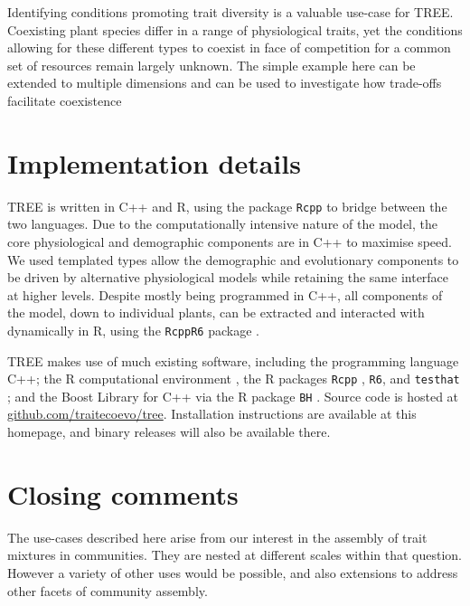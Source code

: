 \documentclass[]{article}
\begin{document}
Identifying conditions promoting trait diversity is a valuable use-case
for TREE. Coexisting plant species differ in a range of physiological
traits, yet the conditions allowing for these different types to coexist
in face of competition for a common set of resources remain largely
unknown. The simple example here can be extended to multiple dimensions
and can be used to investigate how trade-offs facilitate coexistence
\citep{Falster-2015}

\section{Implementation details}\label{implementation-details}

TREE is written in C++ and R, using the package \texttt{Rcpp}
\citep{Eddelbuettel-2011, Eddelbuettel-2013} to bridge between the two
languages. Due to the computationally intensive nature of the model, the
core physiological and demographic components are in C++ to maximise
speed. We used templated types allow the demographic and evolutionary
components to be driven by alternative physiological models while
retaining the same interface at higher levels. Despite mostly being
programmed in C++, all components of the model, down to individual
plants, can be extracted and interacted with dynamically in R, using the
\texttt{RcppR6} package \citep{RcppR6}.

TREE makes use of much existing software, including the programming
language C++; the R computational environment \citep{R-2015}, the R
packages \texttt{Rcpp} \citep{Eddelbuettel-2011, Eddelbuettel-2013},
\texttt{R6}\citep{Chang-2014}, and \texttt{testhat}
\citep{Wickham-2011}; and the Boost Library for C++
\citep{Schaling-2014} via the R package \texttt{BH}
\citep{Eddelbuettel-2015}. Source code is hosted at
\href{https://github.com/traitecoevo/tree}{github.com/traitecoevo/tree}.
Installation instructions are available at this homepage, and binary
releases will also be available there.

\section{Closing comments}\label{closing-comments}

The use-cases described here arise from our interest in the assembly of
trait mixtures in communities. They are nested at different scales
within that question. However a variety of other uses would be possible,
and also extensions to address other facets of community assembly.
\end{document}
